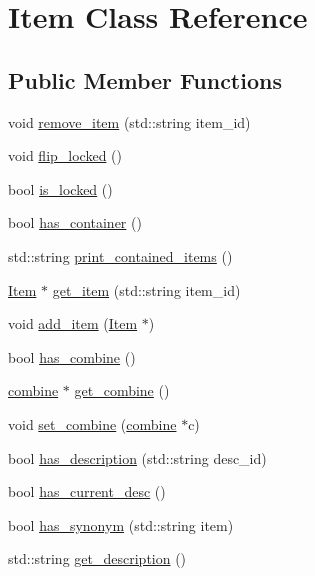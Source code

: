 \hypertarget{class_item}{
\section{\-Item \-Class \-Reference}
\label{class_item}
}
\subsection*{\-Public \-Member \-Functions}
\begin{DoxyCompactItemize}
\item 
void \hyperlink{class_item_a47edaf75180ff10fe40144de345fdab3}{remove\-\_\-item} (std\-::string item\-\_\-id)
\item 
void \hyperlink{class_item_acb7d4c776f5ead3203d80e53b5bdc72a}{flip\-\_\-locked} ()
\item 
bool \hyperlink{class_item_a2618bb10b850279603a202e7480f0b78}{is\-\_\-locked} ()
\item 
bool \hyperlink{class_item_aa2b2218512e8d1735043a95dfc30c719}{has\-\_\-container} ()
\item 
std\-::string \hyperlink{class_item_aeacd2dfc86786b52c8362f9551e75b51}{print\-\_\-contained\-\_\-items} ()
\item 
\hyperlink{class_item}{\-Item} $\ast$ \hyperlink{class_item_a27bb6d69a3c174f6c1815d9ed8ac6fde}{get\-\_\-item} (std\-::string item\-\_\-id)
\item 
void \hyperlink{class_item_a9edf14d98665b133106339442b972837}{add\-\_\-item} (\hyperlink{class_item}{\-Item} $\ast$)
\item 
bool \hyperlink{class_item_a8789a6edd90c43516317f414adba3797}{has\-\_\-combine} ()
\item 
\hyperlink{classcombine}{combine} $\ast$ \hyperlink{class_item_a51176c036075d9d01da030a32911acea}{get\-\_\-combine} ()
\item 
void \hyperlink{class_item_a183a0ec19bfd51e8af5f24d57880ccd1}{set\-\_\-combine} (\hyperlink{classcombine}{combine} $\ast$c)
\item 
bool \hyperlink{class_item_a75f9cdba85ba1ce65b4ff71073ba8387}{has\-\_\-description} (std\-::string desc\-\_\-id)
\item 
bool \hyperlink{class_item_a703702e1992a45ac32beb2eb0e3e38bf}{has\-\_\-current\-\_\-desc} ()
\item 
bool \hyperlink{class_item_a7cf164e34fe584a29aa56dfb73933452}{has\-\_\-synonym} (std\-::string item)
\item 
std\-::string \hyperlink{class_item_a8652cab970af5b7ff68bf960a4e98fa2}{get\-\_\-description} ()

\end{DoxyCompactItemize}
